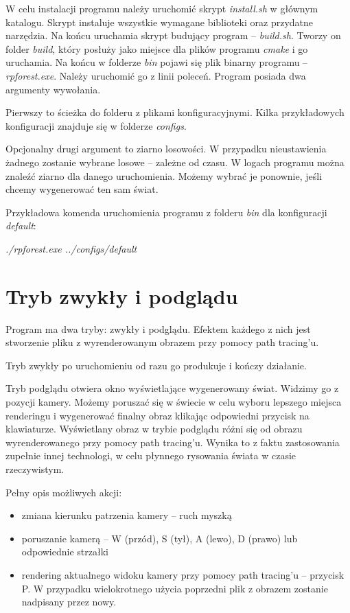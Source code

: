\documentclass[inz,shortabstract]{iithesis}
\begin{document}
        
        W celu instalacji programu należy uruchomić skrypt \textit{install.sh} w głównym katalogu. Skrypt instaluje wszystkie wymagane biblioteki oraz przydatne narzędzia. Na końcu uruchamia skrypt budujący program -- \textit{build.sh}. Tworzy on folder \textit{build}, który posłuży jako miejsce dla plików programu \textit{cmake} i go uruchamia. Na końcu w folderze \textit{bin} pojawi się plik binarny programu -- \textit{rpforest.exe}. Należy uruchomić go z linii poleceń. Program posiada dwa argumenty wywołania. 
        
        Pierwszy to ścieżka do folderu z plikami konfiguracyjnymi. Kilka przykładowych konfiguracji znajduje się w folderze \textit{configs}.
        
        Opcjonalny drugi argument to ziarno losowości. W przypadku nieustawienia żadnego zostanie wybrane losowe -- zależne od czasu. W logach programu można znaleźć ziarno dla danego uruchomienia. Możemy wybrać je ponownie, jeśli chcemy wygenerować ten sam świat. 
    
        Przykładowa komenda uruchomienia programu z folderu \textit{bin} dla konfiguracji \textit{default}: 
        \begin{description}
            \item \textit{./rpforest.exe ../configs/default} 
        \end{description}
        
        
    \section{Tryb zwykły i podglądu}
        Program ma dwa tryby: zwykły i podglądu. Efektem każdego z nich jest stworzenie pliku z wyrenderowanym obrazem przy pomocy path tracing'u.
        
        Tryb zwykły po uruchomieniu od razu go produkuje i kończy działanie. 
        
        Tryb podglądu otwiera okno wyświetlające wygenerowany świat. Widzimy go z pozycji kamery. Możemy poruszać się w świecie w celu wyboru lepszego miejsca renderingu i wygenerować finalny obraz klikając odpowiedni przycisk na klawiaturze. Wyświetlany obraz w trybie podglądu różni się od obrazu wyrenderowanego przy pomocy path tracing'u. Wynika to z faktu zastosowania zupełnie innej technologi, w celu płynnego rysowania świata w czasie rzeczywistym.
        
        Pełny opis możliwych akcji:
        \begin{itemize}
            \item zmiana kierunku patrzenia kamery -- ruch myszką
            \item poruszanie kamerą -- W (przód), S (tył), A (lewo), D (prawo) lub odpowiednie strzałki
            \item rendering aktualnego widoku kamery przy pomocy path tracing'u -- przycisk P. W przypadku wielokrotnego użycia poprzedni plik z obrazem zostanie nadpisany przez nowy.
        \end{itemize}
        
\end{document}
